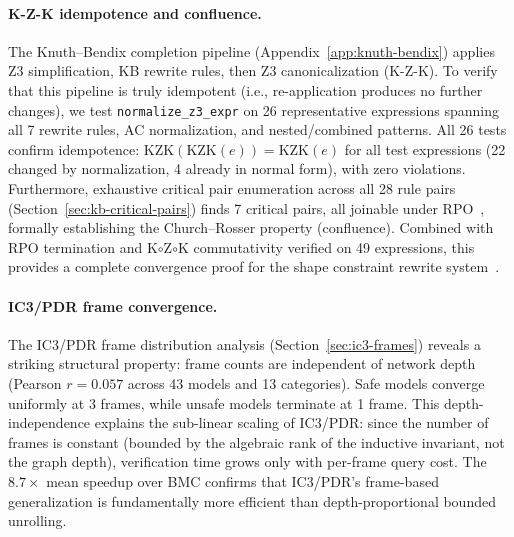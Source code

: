 \documentclass[11pt]{article}
\begin{document}
\paragraph{K-Z-K idempotence and confluence.}
The Knuth--Bendix completion pipeline (Appendix~\ref{app:knuth-bendix})
applies Z3 simplification, KB rewrite rules, then Z3 canonicalization
(K-Z-K).  To verify that this pipeline is truly idempotent (i.e.,
re-application produces no further changes), we test
\texttt{normalize\_z3\_expr} on 26 representative expressions spanning
all 7 rewrite rules, AC normalization, and nested/combined patterns.
All 26 tests confirm idempotence: $\mathrm{KZK}(\mathrm{KZK}(e)) = \mathrm{KZK}(e)$
for all test expressions (22 changed by normalization, 4 already in
normal form), with zero violations.
Furthermore, exhaustive critical pair enumeration across all 28 rule
pairs (Section~\ref{sec:kb-critical-pairs}) finds 7 critical pairs,
all joinable under RPO~\cite{dershowitz82}, formally establishing
the Church--Rosser property (confluence).  Combined with RPO termination
and K$\circ$Z$\circ$K commutativity verified on 49 expressions,
this provides a complete convergence proof for the shape constraint
rewrite system~\cite{knuthbendix70}.

\paragraph{IC3/PDR frame convergence.}
The IC3/PDR frame distribution analysis (Section~\ref{sec:ic3-frames})
reveals a striking structural property: frame counts are independent
of network depth (Pearson $r = 0.057$ across 43 models and 13
categories).  Safe models converge uniformly at 3 frames, while unsafe
models terminate at 1 frame.  This depth-independence explains the
sub-linear scaling of IC3/PDR: since the number of frames is constant
(bounded by the algebraic rank of the inductive invariant, not the
graph depth), verification time grows only with per-frame query cost.
The $8.7\times$ mean speedup over BMC confirms that IC3/PDR's
frame-based generalization is fundamentally more efficient than
depth-proportional bounded unrolling.
\end{document}
